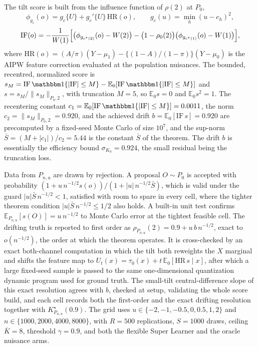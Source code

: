 \documentclass[11pt]{article}
\newcommand{\E}{\mathbb E}
\newcommand{\ind}[1]{\mathbbm 1\{#1\}}
\begin{document}
The tilt score is built from the influence function of $\rho(2)$ at $P_0$,
\[
\phi_{g_c}(o)=g_c\{U\}+g_c'\{U\}\,\mathrm{HR}(o),\qquad g_c(u)=\min_h(u-c_h)^2,
\]
\[
\mathrm{IF}(o)=-\frac1{W(1)}\Bigl[\bigl(\phi_{g_{c^\star(2)}}(o)-W(2)\bigr)-\bigl(1-\rho_0(2)\bigr)\bigl(\phi_{g_{c^\star(1)}}(o)-W(1)\bigr)\Bigr],
\]
where $\mathrm{HR}(o)=(A/\pi)(Y-\mu_1)-\{(1-A)/(1-\pi)\}(Y-\mu_0)$ is the AIPW feature correction evaluated at the population nuisances. The bounded, recentred, normalized score is $s_M=\mathrm{IF}\,\ind{|\mathrm{IF}|\le M}-\E_0[\mathrm{IF}\,\ind{|\mathrm{IF}|\le M}]$ and $s=s_M/\|s_M\|_{P_0,2}$, with truncation $M=5$, so $\E_0 s=0$ and $\E_0 s^2=1$. The recentering constant $c_1=\E_0[\mathrm{IF}\,\ind{|\mathrm{IF}|\le M}]=0.0011$, the norm $c_2=\|s_M\|_{P_0,2}=0.920$, and the achieved drift $b=\E_0[\mathrm{IF}\,s]=0.920$ are precomputed by a fixed-seed Monte Carlo of size $10^7$, and the sup-norm $\bar S=(M+|c_1|)/c_2=5.44$ is the constant $\bar S$ of the theorem. The drift $b$ is essentially the efficiency bound $\sigma_{K_0}=0.924$, the small residual being the truncation loss.

Data from $P_{n,u}$ are drawn by rejection. A proposal $O\sim P_0$ is accepted with probability $(1+u\,n^{-1/2}s(o))/(1+|u|\,n^{-1/2}\bar S)$, which is valid under the guard $|u|\bar S\,n^{-1/2}<1$, satisfied with room to spare in every cell, where the tighter theorem condition $|u|\bar S\,n^{-1/2}\le1/2$ also holds. A built-in unit test confirms $\E_{P_{n,u}}[s(O)]=u\,n^{-1/2}$ to Monte Carlo error at the tightest feasible cell. The drifting truth is reported to first order as $\rho_{P_{n,u}}(2)=0.9+u\,b\,n^{-1/2}$, exact to $o(n^{-1/2})$, the order at which the theorem operates. It is cross-checked by an exact both-channel computation in which the tilt both reweights the $X$ marginal and shifts the feature map to $U_t(x)=\tau_0(x)+t\,\E_0[\mathrm{HR}\,s\mid x]$, after which a large fixed-seed sample is passed to the same one-dimensional quantization dynamic program used for ground truth. The small-tilt central-difference slope of this exact resolution agrees with $b$, checked at setup, validating the whole score build, and each cell records both the first-order and the exact drifting resolution together with $K^\star_{P_{n,u}}(0.9)$. The grid uses $u\in\{-2,-1,-0.5,0,0.5,1,2\}$ and $n\in\{1000,2000,4000,8000\}$, with $R=500$ replications, $S=1000$ draws, ceiling $\overline K=8$, threshold $\gamma=0.9$, and both the flexible Super Learner and the oracle nuisance arms.
\end{document}
